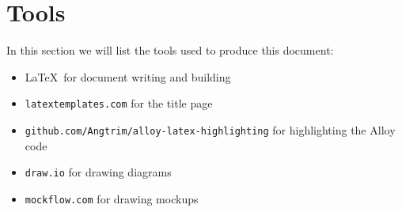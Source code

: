\documentclass[12pt]{article}
\begin{document}

\clearpage

\nonumber

\tableofcontents
\clearpage

\pagestyle{fancy}
\fancyhead[LE,RO]{\slshape \rightmark}
\fancyhead[LO,RE]{\slshape \leftmark}
\renewcommand{\footrulewidth}{0.3pt}
\cfoot{}


\clearpage


\clearpage


\clearpage


\clearpage


\clearpage


\clearpage


\clearpage

\section*{Tools}

  In this section we will list the tools used to produce this document:
  \begin{itemize}
    \item \LaTeX\ for document writing and building

    \item \texttt{latextemplates.com} for the title page

    \item \texttt{github.com/Angtrim/alloy-latex-highlighting} for highlighting the Alloy code

    \item \texttt{draw.io} for drawing diagrams

    \item \texttt{mockflow.com} for drawing mockups

  \end{itemize}


\end{document}
